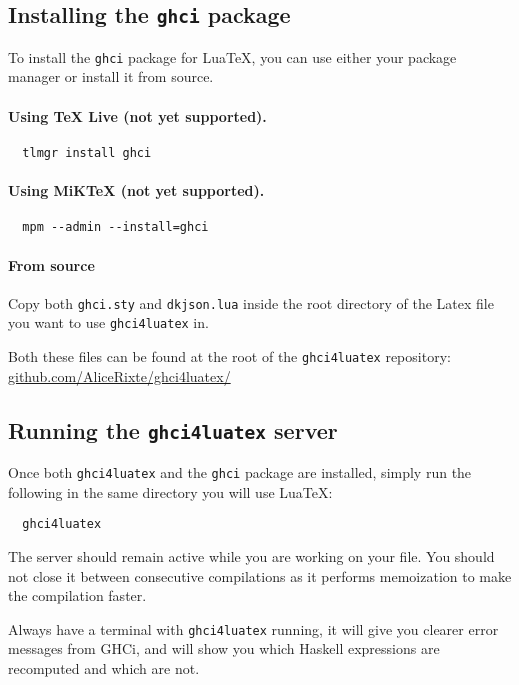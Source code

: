 \documentclass{article}
\begin{document}
\subsection{Installing the \texttt{ghci} package}

To install the \texttt{ghci} package for Lua\TeX, you can use either your package manager or install it from source.

\paragraph{Using TeX Live (not yet supported).}
\begin{verbatim}
  tlmgr install ghci
\end{verbatim}
\paragraph{Using MiKTeX (not yet supported). }
\begin{verbatim}
  mpm --admin --install=ghci
\end{verbatim}
\paragraph{From source}
Copy both \texttt{ghci.sty} and \texttt{dkjson.lua} inside the root directory of the Latex file you want to use \texttt{ghci4luatex} in.

Both these files can be found at the root of the \texttt{ghci4luatex} repository: \href{https://github.com/AliceRixte/ghci4luatex/}{github.com/AliceRixte/ghci4luatex/}

\subsection{Running the \texttt{ghci4luatex} server}

Once both \texttt{ghci4luatex} and the \texttt{ghci} package are installed, simply run the following in the same directory you will use LuaTeX:

\begin{verbatim}
  ghci4luatex
\end{verbatim}

The server should remain active while you are working on your file. You should not close it between consecutive compilations as it performs memoization to make the compilation faster.

\begin{tipbox}
Always have a terminal with \texttt{ghci4luatex} running, it will give you clearer error messages from GHCi, and will show you which Haskell expressions are recomputed and which are not.
\end{tipbox}
\end{document}
